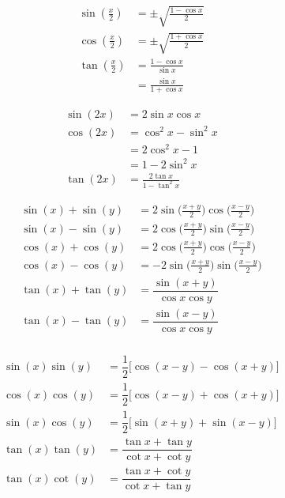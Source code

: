 \documentclass[main.tex]{subfiles}
\begin{document}
\begin{Theorem}[Halbwinkelidentität]
  $$\begin{aligned}
    \sin \left(\frac{x}{2}\right)  &= \pm \sqrt{ \frac{1 - \cos x }{2} }\\
    \cos \left(\frac{x}{2}\right)  &= \pm \sqrt{ \frac{1 + \cos x }{2} }\\
    \tan \left(\frac{x}{2}\right)  &= \frac{1 - \cos x }{\sin x}\\
                      &= \frac{ \sin x }{ 1 + \cos x }
  \end{aligned}$$
\end{Theorem}
\begin{Theorem}[Doppelwinkelidentität]
  $$\begin{aligned}
    \sin(2x)  &= 2 \sin x \cos x\\
    \cos(2x)  &= \cos^2 x - \sin^2 x\\
              &= 2 \cos^2 x - 1\\
              &= 1 - 2 \sin^2 x\\
    \tan(2x)  &= \frac{2 \tan x}{1 - \tan^2 x}
  \end{aligned}$$
\end{Theorem}

\begin{Theorem}
  $$\begin{aligned}
    \sin (x) + \sin (y) &= 2 \sin \Big( \frac{x + y}{2} \Big) \cos \Big( \frac{x - y}{2} \Big)\\
    \sin (x) - \sin (y) &= 2 \cos \Big( \frac{x + y}{2} \Big) \sin \Big( \frac{x - y}{2} \Big)\\
    \cos (x) + \cos (y) &= 2 \cos \Big( \frac{x + y}{2} \Big) \cos \Big( \frac{x - y}{2} \Big)\\
    \cos (x) - \cos (y) &= -2 \sin \Big( \frac{x + y}{2} \Big) \sin \Big( \frac{x - y}{2} \Big)\\
    \tan (x) + \tan (y) &= \dfrac{ \sin(x + y) }{ \cos x \cos y}\\
    \tan (x) - \tan (y) &= \dfrac{ \sin(x - y) }{ \cos x \cos y}\\
  \end{aligned}$$
\end{Theorem}

\begin{Theorem}
  $$\begin{aligned}
    \sin (x) \sin (y) &= \dfrac{1}{2}\big[\cos(x - y) - \cos(x + y)\big]\\
    \cos (x) \cos (y) &= \dfrac{1}{2}\big[\cos(x - y) + \cos(x + y)\big]\\
    \sin (x) \cos (y) &= \dfrac{1}{2}\big[\sin(x + y) + \sin(x - y)\big]\\
    \tan (x) \tan (y) &= \dfrac{ \tan x + \tan y }{ \cot x + \cot y }\\
    \tan (x) \cot (y) &= \dfrac{ \tan x + \cot y }{ \cot x + \tan y }
  \end{aligned}$$
\end{Theorem}
\end{document}
